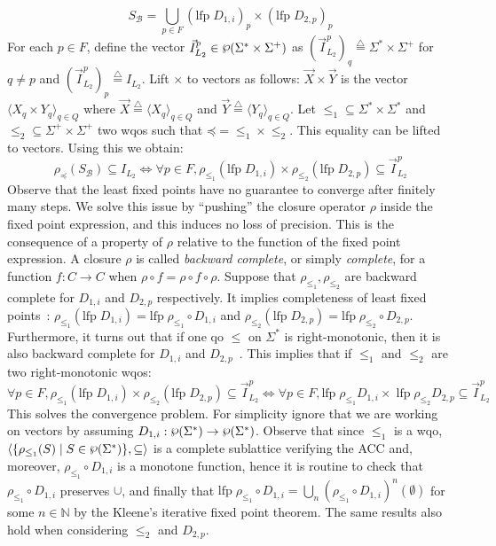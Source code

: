 \[ S_{\mathcal{B}} = \bigcup_{p \in F} (\textrm{lfp} \; D_{1,i})_p \times (\textrm{lfp} \; D_{2,p})_p \]
For each $p \in F$, define the vector
$\vec{I}_{L_2}^p \in \powerset(\Sigma^* \times \Sigma^+)$
as $(\vec{I}_{L_2}^p)_q \overset{\triangle}{=} \Sigma^* \times \Sigma^+$ for $q \neq p$
and $(\vec{I}_{L_2}^p)_p \overset{\triangle}{=} I_{L_2}$.
Lift $\times$ to vectors as follows: $\vec{X} \times \vec{Y}$ is the vector
$\langle X_q \times Y_q \rangle_{q \in Q}$ where
$\vec{X} \overset{\triangle}{=}  \langle X_q \rangle_{q \in Q}$ and
$\vec{Y} \overset{\triangle}{=}  \langle Y_q \rangle_{q \in Q}$.
Let $\mathord{\leq_1} \subseteq \Sigma^* \times \Sigma^*$ and
$\mathord{\leq_2} \subseteq \Sigma^+ \times \Sigma^+$ two wqos
such that $\mathord{\preceq} = \mathord{\leq_1} \times \mathord{\leq_2}$.
This equality can be lifted to vectors.
Using this we obtain:
\[ \rho_{\preceq}(S_{\mathcal{B}}) \subseteq I_{L_2}
\Longleftrightarrow \forall p \in F, \rho_{\leq_1} (\textrm{lfp} \; D_{1,i})
\times \rho_{\leq_2}(\textrm{lfp} \; D_{2,p}) \subseteq \vec{I}_{L_2}^p\]
Observe that the least fixed points have no guarantee to converge after finitely
many steps.
We solve this issue by ``pushing'' the closure operator $\rho$ inside the fixed
point expression, and this induces no loss of precision.
This is the consequence of a property of $\rho$ relative to the function of the
fixed point expression.
A closure $\rho$ is called \emph{backward complete}, or simply \emph{complete},
for a function $f: C \rightarrow C$ when $\rho \circ f = \rho \circ f \circ \rho$.
Suppose that $\rho_{\leq_1}, \rho_{\leq_2}$ are backward complete for
$D_{1,i}$ and $ D_{2,p}$ respectively.
It implies completeness of least fixed points~\cite{cousot1979systematic}:
$\rho_{\leq_1} (\textrm{lfp} \; D_{1,i}) = \textrm{lfp} \; \rho_{\leq_1} \circ D_{1,i}$ and
$\rho_{\leq_2} (\textrm{lfp} \; D_{2,p}) = \textrm{lfp} \; \rho_{\leq_2} \circ D_{2,p}$.
Furthermore, it turns out that if one qo $\leq$ on $\Sigma^*$ is right-monotonic,
then it is also backward complete for $D_{1,i}$ and $D_{2,p}$~\cite{ganty2020omegalang}.
This implies that if $\leq_1$ and $\leq_2$ are two right-monotonic wqos:
\[ \forall p \in F, \rho_{\leq_1} (\textrm{lfp} \; D_{1,i})
\times \rho_{\leq_2}(\textrm{lfp} \; D_{2,p}) \subseteq \vec{I}_{L_2}^p
\Longleftrightarrow
\forall p \in F, \textrm{lfp} \; \rho_{\leq_1} D_{1,i}
\times \; \textrm{lfp} \; \rho_{\leq_2}  D_{2,p} \subseteq \vec{I}_{L_2}^p\]
This solves the convergence problem.
For simplicity ignore that we are working on vectors by assuming
$D_{1,i}: \powerset(\Sigma^*) \rightarrow \powerset(\Sigma^*)$.
Observe that since $\leq_1$ is a wqo,
$\langle \{ \rho_{\leq_1} (S) \;|\; S \in \powerset (\Sigma^*)\}, \subseteq \rangle$
is a complete sublattice verifying the ACC and, moreover, $\rho_{\leq_1} \circ D_{1,i}$
is a monotone function, hence it is routine to check that $\rho_{\leq_1} \circ D_{1,i}$
preserves $\cup$, and finally that
$\textrm{lfp} \; \rho_{\leq_1} \circ D_{1,i} =
\bigcup_n (\rho_{\leq_1} \circ D_{1,i})^n (\emptyset)$ for some $n \in \mathbb{N}$
by the Kleene's iterative fixed point theorem.
The same results also hold when considering $\leq_2$ and $D_{2,p}$.

